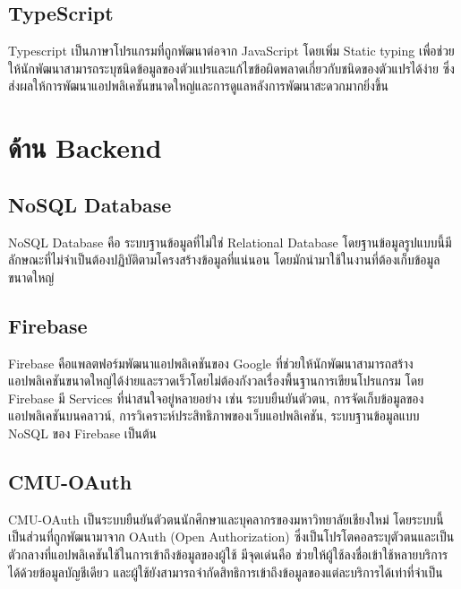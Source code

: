 \subsection{TypeScript}
Typescript เป็นภาษาโปรแกรมที่ถูกพัฒนาต่อจาก JavaScript โดยเพิ่ม Static typing เพื่อช่วยให้นักพัฒนาสามารถระบุชนิดข้อมูลของตัวแปรและแก้ไขข้อผิดพลาดเกี่ยวกับชนิดของตัวแปรได้ง่าย ซึ่งส่งผลให้การพัฒนาแอปพลิเคชันขนาดใหญ่และการดูแลหลังการพัฒนาสะดวกมากยิ่งขึ้น \cite{typescript}

\section{ด้าน Backend}
\subsection{NoSQL Database}
NoSQL Database คือ ระบบฐานข้อมูลที่ไม่ใช่ Relational Database โดยฐานข้อมูลรูปแบบนี้มีลักษณะที่ไม่จำเป็นต้องปฏิบัติตามโครงสร้างข้อมูลที่แน่นอน โดยมักนำมาใช้ในงานที่ต้องเก็บข้อมูลขนาดใหญ่
\cite{nosql}
\subsection{Firebase}
Firebase คือแพลตฟอร์มพัฒนาแอปพลิเคชันของ Google ที่ช่วยให้นักพัฒนาสามารถสร้างแอปพลิเคชันขนาดใหญ่ได้ง่ายและรวดเร็วโดยไม่ต้องกังวลเรื่องพื้นฐานการเขียนโปรแกรม
โดย Firebase มี Services ที่น่าสนใจอยู่หลายอย่าง เช่น ระบบยืนยันตัวตน, การจัดเก็บข้อมูลของแอปพลิเคชันบนคลาวน์, การวิเคราะห์ประสิทธิภาพของเว็บแอปพลิเคชัน, ระบบฐานข้อมูลแบบ NoSQL ของ Firebase เป็นต้น
\cite{firebase}
\subsection{CMU-OAuth}
CMU-OAuth เป็นระบบยืนยันตัวตนนักศึกษาและบุคลากรของมหาวิทยาลัยเชียงใหม่ โดยระบบนี้เป็นส่วนที่ถูกพัฒนามาจาก OAuth (Open Authorization) ซึ่งเป็นโปรโตคอลระบุตัวตนและเป็นตัวกลางที่แอปพลิเคชันใช้ในการเข้าถึงข้อมูลของผู้ใช้ มีจุดเด่นคือ ช่วยให้ผู้ใช้ลงชื่อเข้าใช้หลายบริการ
ได้ด้วยข้อมูลบัญชีเดียว และผู้ใช้ยังสามารถจำกัดสิทธิการเข้าถึงข้อมูลของแต่ละบริการได้เท่าที่จำเป็น
\cite{oauth}
